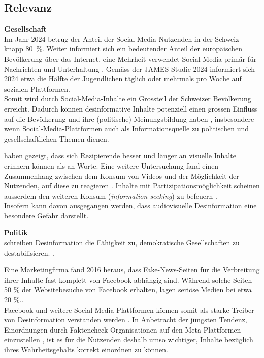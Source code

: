 \documentclass[12pt,a4paper]{article}        %
\begin{document}
\subsection{Relevanz}
\textbf{Gesellschaft} \\
Im Jahr 2024 betrug der Anteil der Social-Media-Nutzenden in der Schweiz knapp 80 \%. Weiter informiert sich ein bedeutender Anteil der europäischen Bevölkerung über das Internet, eine Mehrheit verwendet Social Media primär für Nachrichten und Unterhaltung \parencite[21ff]{we_are_social_anteil_2024}. Gemäss der JAMES-Studie 2024 \parencite[40]{kulling-knecht_james_2024} informiert sich 2024 etwa die Hälfte der Jugendlichen täglich oder mehrmals pro Woche auf sozialen Plattformen. \\
Somit wird durch Social-Media-Inhalte ein Grossteil der Schweizer Bevölkerung erreicht. Dadurch können desinformative Inhalte potenziell einen grossen Einfluss auf die Bevölkerung und ihre (politische) Meinungsbildung haben \parencites[18]{grujic_warnhinweise_2024}[258]{hohlfeld_schlechte_2020}[1f]{khan_fake_2021}, insbesondere wenn Social-Media-Plattformen auch als Informationsquelle zu politischen und gesellschaftlichen Themen dienen.

\textcite{grady_neural_1998} haben gezeigt, dass sich Rezipierende besser und länger an visuelle Inhalte erinnern können als an Worte. Eine weitere Untersuchung fand einen Zusammenhang zwischen dem Konsum von Videos und der Möglichkeit der Nutzenden, auf diese zu reagieren \parencite[242]{khan_social_2017}. Inhalte mit Partizipationsmöglichkeit scheinen ausserdem den weiteren Konsum (\textit{information seeking}) zu befeuern \parencite[243]{khan_social_2017}. \\
Insofern kann davon ausgegangen werden, dass audiovisuelle Desinformation eine besondere Gefahr darstellt. 

\textbf{Politik} \\
\textcite[258]{hohlfeld_schlechte_2020} schreiben Desinformation die Fähigkeit zu, demokratische Gesellschaften  zu destabilisieren. \parencite[vgl.\ auch][1]{khan_fake_2021}.

Eine Marketingfirma fand 2016 heraus, dass Fake-News-Seiten für die Verbreitung ihrer Inhalte fast komplett  von Facebook abhängig sind. Während solche Seiten 50 \% der Websitebesuche von Facebook erhalten, lagen seriöse Medien bei etwa 20 \%.\parencites{wong_almost_2016}[zit.\ nach][1]{khan_fake_2021}[vgl.\ auch][212]{allcott_social_2017}. \\
Facebook und weitere Social-Media-Plattformen können somit als starke Treiber von Desinformation verstanden werden \parencite{wong_almost_2016}. In Anbetracht der jüngsten Tendenz, Einordnungen durch Faktencheck-Organisationen auf den Meta-Plattformen einzustellen \parencites{isaac_meta_2025}{meta_transparency_centre_penalties_2025}, ist es für die Nutzenden deshalb umso wichtiger, Inhalte bezüglich ihres Wahrheitsgehalts korrekt einordnen zu können. 
\end{document}
